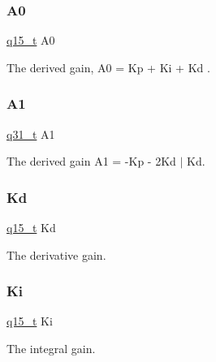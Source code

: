 \subsubsection{\texorpdfstring{A0}{A0}}
{\footnotesize\ttfamily \mbox{\hyperlink{arm__math_8h_ab5a8fb21a5b3b983d5f54f31614052ea}{q15\+\_\+t}} A0}

The derived gain, A0 = Kp + Ki + Kd . \mbox{\label{structarm__pid__instance__q15_aeb897c84724b56948e4222aca8d0e1f4}} 
\subsubsection{\texorpdfstring{A1}{A1}}
{\footnotesize\ttfamily \mbox{\hyperlink{arm__math_8h_adc89a3547f5324b7b3b95adec3806bc0}{q31\+\_\+t}} A1}

The derived gain A1 = -\/Kp -\/ 2Kd $\vert$ Kd. \mbox{\label{structarm__pid__instance__q15_abf38d18de1e16bc6d86846fedf8534fe}} 
\subsubsection{\texorpdfstring{Kd}{Kd}}
{\footnotesize\ttfamily \mbox{\hyperlink{arm__math_8h_ab5a8fb21a5b3b983d5f54f31614052ea}{q15\+\_\+t}} Kd}

The derivative gain. \mbox{\label{structarm__pid__instance__q15_a19d5059baf06dd52266260d096702d0a}} 
\subsubsection{\texorpdfstring{Ki}{Ki}}
{\footnotesize\ttfamily \mbox{\hyperlink{arm__math_8h_ab5a8fb21a5b3b983d5f54f31614052ea}{q15\+\_\+t}} Ki}

The integral gain. \mbox{\label{structarm__pid__instance__q15_afef61fb3b64c73f2cd0c91d9dcf95679}} 
